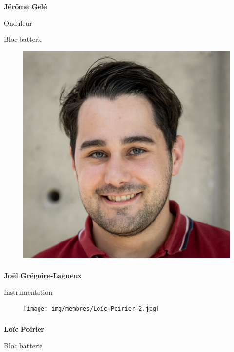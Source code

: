 \documentclass[a0paper,portrait]{baposter}
\begin{document}
\begin{poster}
{\subsubsection*{}
\textbf{Jérôme Gelé}

Onduleur

Bloc batterie

\begin{figure}
\includegraphics[width=.9\linewidth]{img/membres/Joël-Grégoire-Lagueux-1.jpg} 
\end{figure}
\subsubsection*{}
\vspace{2mm}
\textbf{Joël Grégoire-Lagueux}

Instrumentation

\begin{figure}
\texttt{[image: img/membres/Loïc-Poirier-2.jpg]} 
\end{figure}
\subsubsection*{}
\textbf{Loïc Poirier}

Bloc batterie

}
\end{poster}
\end{document}
